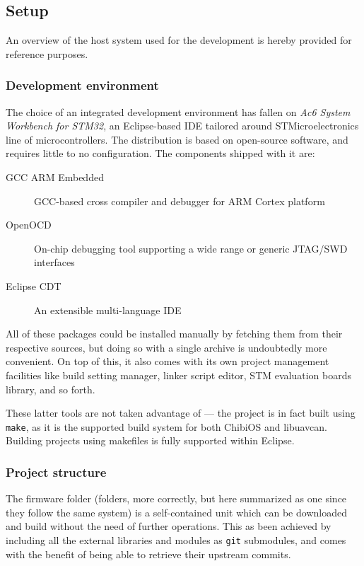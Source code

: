 \subsection{Setup}\label{subsec:sw_setup}
An overview of the host system used for the development is hereby provided for reference purposes.

\subsubsection{Development environment}
The choice of an integrated development environment has fallen on \emph{Ac6 System Workbench for STM32}, an Eclipse-based IDE tailored around STMicroelectronics line of microcontrollers.
The distribution is based on open-source software, and requires little to no configuration.
The components shipped with it are:
\begin{description}
    \item[GCC ARM Embedded] GCC-based cross compiler and debugger for ARM Cortex platform
    \item[OpenOCD] On-chip debugging tool supporting a wide range or generic JTAG/SWD interfaces
    \item[Eclipse CDT] An extensible multi-language IDE
\end{description}
All of these packages could be installed manually by fetching them from their respective sources, but doing so with a single archive is undoubtedly more convenient.
On top of this, it also comes with its own project management facilities like build setting manager, linker script editor, STM evaluation boards library, and so forth.

These latter tools are not taken advantage of --- the project is in fact built using \texttt{make}, as it is the supported build system for both ChibiOS and libuavcan.
Building projects using makefiles is fully supported within Eclipse.




\subsubsection{Project structure}
The firmware folder (folders, more correctly, but here summarized as one since they follow the same system) is a self-contained unit which can be downloaded and build without the need of further operations.
This as been achieved by including all the external libraries and modules as \texttt{git} submodules, and comes with the benefit of being able to retrieve their upstream commits.

